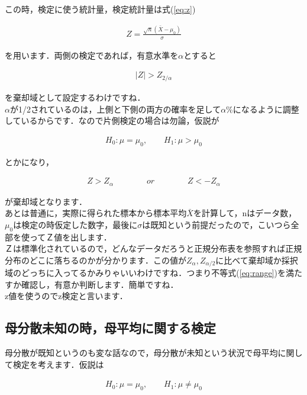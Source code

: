 \documentclass[11pt,a4paper]{ujreport} 	%
\begin{document}
この時，検定に使う統計量，検定統計量は式(\ref{eq:z})

\begin{align}
  Z = \frac{\sqrt{n}(\bar{X}-\mu_0)}{\sigma}
\end{align}

を用います．両側の検定であれば，有意水準を$\alpha$とすると

\begin{align}
  |Z| > Z_{2/\alpha}
  \label{eq:range}
\end{align}

を棄却域として設定するわけですね．\\

$\alpha$が1/2されているのは，上側と下側の両方の確率を足して$\alpha$\%になるように調整しているからです．なので片側検定の場合は勿論，仮説が

\begin{align}
  H_0 : \mu = \mu_0, \qquad H_1 : \mu > \mu_0
\end{align}

とかになり，

\begin{align}
  Z > Z_\alpha \qquad \qquad or \qquad \qquad Z < - Z_\alpha
\end{align}

が棄却域となります．\\

あとは普通に，実際に得られた標本から標本平均$\bar{X}$を計算して，nはデータ数，$\mu_0$は検定の時仮定した数字，最後に$\sigma$は既知という前提だったので，こいつら全部を使ってＺ値を出します．\\

Ｚは標準化されているので，どんなデータだろうと正規分布表を参照すれば正規分布のどこに落ちるのかが分かります．この値が$Z_{\alpha}, Z_{\alpha/2}$に比べて棄却域か採択域のどっちに入ってるかみりゃいいわけですね．つまり不等式(\ref{eq:range})を満たすか確認し，有意か判断します．簡単ですね．\\

z値を使うのでz検定と言います．

\subsection{母分散未知の時，母平均に関する検定}
母分散が既知というのも変な話なので，母分散が未知という状況で母平均に関して検定を考えます．仮説は

\begin{align}
  H_0 : \mu = \mu_0, \qquad H_1 : \mu \neq \mu_0
\end{align}
\end{document}
